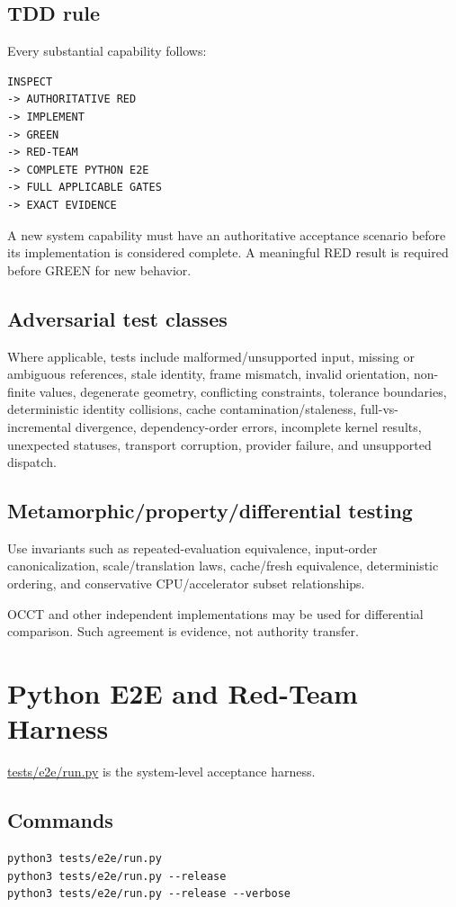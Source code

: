 \documentclass[11pt,a4paper]{report}
\newcommand{\pathref}[1]{\url{#1}}
\begin{document}
\section{TDD rule}

Every substantial capability follows:

\begin{lstlisting}
INSPECT
-> AUTHORITATIVE RED
-> IMPLEMENT
-> GREEN
-> RED-TEAM
-> COMPLETE PYTHON E2E
-> FULL APPLICABLE GATES
-> EXACT EVIDENCE
\end{lstlisting}

A new system capability must have an authoritative acceptance scenario before its implementation is considered complete. A meaningful RED result is required before GREEN for new behavior.

\section{Adversarial test classes}

Where applicable, tests include malformed/unsupported input, missing or ambiguous references, stale identity, frame mismatch, invalid orientation, non-finite values, degenerate geometry, conflicting constraints, tolerance boundaries, deterministic identity collisions, cache contamination/staleness, full-vs-incremental divergence, dependency-order errors, incomplete kernel results, unexpected statuses, transport corruption, provider failure, and unsupported dispatch.

\section{Metamorphic/property/differential testing}

Use invariants such as repeated-evaluation equivalence, input-order canonicalization, scale/translation laws, cache/fresh equivalence, deterministic ordering, and conservative CPU/accelerator subset relationships.

OCCT and other independent implementations may be used for differential comparison. Such agreement is evidence, not authority transfer.

\chapter{Python E2E and Red-Team Harness}

\pathref{tests/e2e/run.py} is the system-level acceptance harness.

\section{Commands}
\begin{lstlisting}
python3 tests/e2e/run.py
python3 tests/e2e/run.py --release
python3 tests/e2e/run.py --release --verbose
\end{lstlisting}
\end{document}
